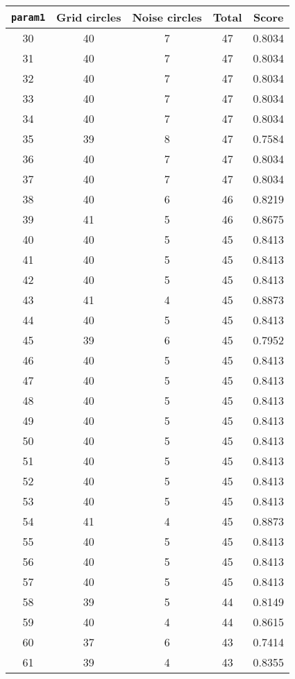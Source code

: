 \documentclass[letterpaper, 12pt]{article}
\begin{document}
\begin{longtable}{|c|c|c|c|c|}
\hline
\textbf{\texttt{param1}} & \textbf{Grid circles} & \textbf{Noise circles} & \textbf{Total} & \textbf{Score} \\
\hline
30 & 40 & 7 & 47 & 0.8034 \\
\hline
31 & 40 & 7 & 47 & 0.8034 \\
\hline
32 & 40 & 7 & 47 & 0.8034 \\
\hline
33 & 40 & 7 & 47 & 0.8034 \\
\hline
34 & 40 & 7 & 47 & 0.8034 \\
\hline
35 & 39 & 8 & 47 & 0.7584 \\
\hline
36 & 40 & 7 & 47 & 0.8034 \\
\hline
37 & 40 & 7 & 47 & 0.8034 \\
\hline
38 & 40 & 6 & 46 & 0.8219 \\
\hline
39 & 41 & 5 & 46 & 0.8675 \\
\hline
40 & 40 & 5 & 45 & 0.8413 \\
\hline
41 & 40 & 5 & 45 & 0.8413 \\
\hline
42 & 40 & 5 & 45 & 0.8413 \\
\hline
43 & 41 & 4 & 45 & 0.8873 \\
\hline
44 & 40 & 5 & 45 & 0.8413 \\
\hline
45 & 39 & 6 & 45 & 0.7952 \\
\hline
46 & 40 & 5 & 45 & 0.8413 \\
\hline
47 & 40 & 5 & 45 & 0.8413 \\
\hline
48 & 40 & 5 & 45 & 0.8413 \\
\hline
49 & 40 & 5 & 45 & 0.8413 \\
\hline
50 & 40 & 5 & 45 & 0.8413 \\
\hline
51 & 40 & 5 & 45 & 0.8413 \\
\hline
52 & 40 & 5 & 45 & 0.8413 \\
\hline
53 & 40 & 5 & 45 & 0.8413 \\
\hline
54 & 41 & 4 & 45 & 0.8873 \\
\hline
55 & 40 & 5 & 45 & 0.8413 \\
\hline
56 & 40 & 5 & 45 & 0.8413 \\
\hline
57 & 40 & 5 & 45 & 0.8413 \\
\hline
58 & 39 & 5 & 44 & 0.8149 \\
\hline
59 & 40 & 4 & 44 & 0.8615 \\
\hline
60 & 37 & 6 & 43 & 0.7414 \\
\hline
61 & 39 & 4 & 43 & 0.8355 \\

\end{longtable}
\end{document}

